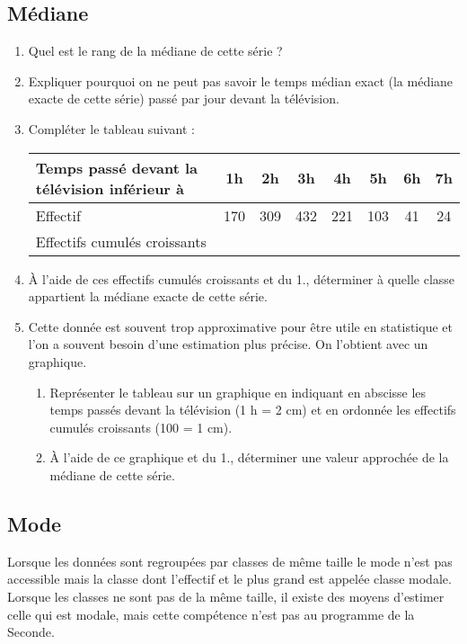 \subsection{Médiane}
\begin{enumerate}
	\item Quel est le rang de la médiane de cette série ?
	\item Expliquer pourquoi on ne peut pas savoir le temps médian exact (la médiane exacte de cette série) passé
par jour devant la télévision.
\item Compléter le tableau suivant :
\begin{center}
\begin{tabular}{|m{4cm}|*{7}{c|}}
\hline
Temps passé devant la télévision inférieur à & 1h &2h &3h &4h &5h& 6h &7h\\ \hline
Effectif& 170& 309& 432& 221& 103& 41& 24\\ \hline
Effectifs cumulés croissants& & & & & & & \\ \hline
\end{tabular}
\end{center}
\item À l'aide de ces effectifs cumulés croissants et du 1., déterminer à quelle classe appartient la médiane exacte
de cette série.
\item Cette donnée est souvent trop approximative pour être utile en statistique et l'on a souvent besoin d'une
estimation plus précise.
On l'obtient avec un graphique.
\begin{enumerate}
	\item Représenter le tableau sur un graphique en indiquant en abscisse les temps passés devant la
télévision (1 h = 2 cm) et en ordonnée les effectifs cumulés croissants (100 = 1 cm).
\item À l'aide de ce graphique et du 1., déterminer une valeur approchée de la médiane de cette série.
\end{enumerate}
\end{enumerate}

\subsection{Mode}
Lorsque les données sont regroupées par classes de même taille le mode n'est pas accessible mais la classe dont
l'effectif et le plus grand est appelée classe modale.
Lorsque les classes ne sont pas de la même taille, il existe des moyens d'estimer celle qui est modale, mais cette
compétence n'est pas au programme de la Seconde.

